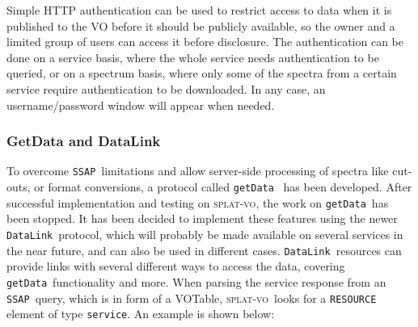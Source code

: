 \documentclass[final,authoryear,5p,times,twocolumn]{elsarticle}
\newcommand{\datalink}{\texttt{DataLink}}
\newcommand{\ssap}{\texttt{SSAP}}
\newcommand{\getdata}{\texttt{getData}}
\newcommand{\votable}{VOTable}
\newcommand{\splatvo}{\textsc{splat-vo}}
\begin{document}
Simple HTTP authentication can be used to restrict access to data when it is published to the VO before it should be
publicly available, so the owner and a limited group of users can
access it before disclosure. The authentication can be done on a
service basis, where the whole service needs authentication to be
queried, or on a spectrum basis, where only some of the spectra from a
certain service require authentication to be downloaded. In any case,
an username/password window will appear when needed.

\subsubsection{GetData and DataLink}

To overcome \ssap\ limitations and allow server-side processing of
spectra like cut-outs, or format conversions, a protocol called
\getdata\ \citep{getData}  has been developed. After successful implementation and
testing on \splatvo, the work on \getdata\ has been stopped. It has been
decided to implement these features using the newer \datalink\
protocol, which will probably be made available on several services in
the near future, and can also be used in different cases.  \datalink\
resources can provide links with several different ways to access the data,
covering \getdata\ functionality and more.
When parsing the service response from an \ssap\ query, which is in form
of a \votable, \splatvo\ looks for a \texttt{RESOURCE} element of type \texttt{service}.
An example is shown below:
\end{document}
